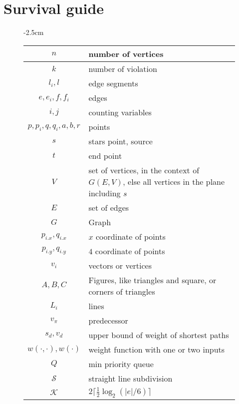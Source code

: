 \chapter{Survival guide}

\begin{figure}
\begin{center}
    \addtolength{\leftskip} {-2.5cm} %
    \addtolength{\rightskip}{-2.5cm}
\begin{tabular}{| c | l |}
	\hline
	$n$ & number of vertices \\
	\hline
	$k$ & number of violation \\
	\hline
	$l_i,l$ & edge segments \\
	\hline
	$e,e_i,f,f_i$ & edges \\
	\hline
	$i,j$ & counting variables \\
	\hline
	$p,p_i,q,q_i,a,b,r$ & points \\
	\hline
	$s$ & stars point, source \\
	\hline
	$t$ & end point \\
	\hline
	$V$ & set of vertices, in the context of $G(E,V)$, else all vertices in the plane including $s$\\
	\hline
	$E$ & set of edges \\
	\hline
	$G$ & Graph \\
	\hline
	$p_{i.x}, q_{i.x}$ & $x$ coordinate of points \\
	\hline
	$p_{i.y}, q_{i.y}$ & $4$ coordinate of points\\
	\hline
	$v_i$ & vectors or vertices \\
	\hline
	$A,B,C$ & Figures, like triangles and square, or corners of triangles \\
	\hline
	$L_i$ & lines \\
	\hline
	$v_{\pi}$ & predecessor \\
	\hline
	$s_d, v_d$ & upper bound of weight of shortest paths \\
	\hline
	$w(\cdot, \cdot), w(\cdot)$ & weight function with one or two inputs \\
	\hline
	$Q$ & min priority queue \\
	\hline
	$\mathcal{S}$ & straight line subdivision \\
	\hline
	$\mathcal{K}$ & $2 \lceil \frac{1}{2} \log_2 (|e|/6) \rceil$ \\
	\hline
\end{tabular}
\end{center}
\end{figure}


